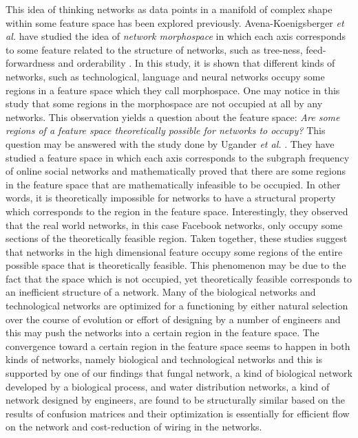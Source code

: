\documentclass{article}
\begin{document}
This idea of thinking networks as data points in a manifold of complex shape within some feature space has been explored previously. Avena-Koenigsberger \textit{et al.} have studied the idea of \textit{network morphospace} in which each axis corresponds to some feature related to the structure of networks, such as tree-ness, feed-forwardness and orderability \cite{NetworkMorphospace}. In this study, it is shown that different kinds of networks, such as technological, language and neural networks occupy some regions in a feature space which they call morphospace. One may notice in this study that some regions in the morphospace are not occupied at all by any networks. This observation yields a question about the feature space: \textit{Are some regions of a feature space theoretically possible for networks to occupy?} This question may be answered with the study done by Ugander \textit{et al.} \cite{Ugander:2013}. They have studied a feature space in which each axis corresponds to the subgraph frequency of online social networks and mathematically proved that there are some regions in the feature space that are mathematically infeasible to be occupied. In other words, it is theoretically impossible for networks to have a structural property which corresponds to the region in the feature space. Interestingly, they observed that the real world networks, in this case Facebook networks, only occupy some sections of the theoretically feasible region. Taken together, these studies suggest that networks in the high dimensional feature occupy some regions of the entire possible space that is theoretically feasible. This phenomenon may be due to the fact that the space which is not occupied, yet theoretically feasible corresponds to an inefficient structure of a network. Many of the biological networks and technological networks are optimized for a functioning by either natural selection over the course of evolution or effort of designing by a number of engineers and this may push the networks into a certain region in the feature space. The convergence toward a certain region in the feature space seems to happen in both kinds of networks, namely biological and technological networks and this is supported by one of our findings that fungal network, a kind of biological network developed by a biological process, and water distribution networks, a kind of network designed by engineers, are found to be structurally similar based on the results of confusion matrices and their optimization is essentially for efficient flow on the network and cost-reduction of wiring in the networks.
 
\end{document}
